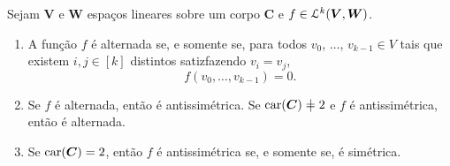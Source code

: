 \begin{proposition}
Sejam $\bm V$ e $\bm W$ espaços lineares sobre um corpo $\bm C$ e $f \in \mathcal{L}^k(\bm V,\bm W)$.
	\begin{enumerate}
	\item A função $f$ é alternada se, e somente se, para todos $v_0$, $\ldots$, $v_{k-1} \in V$ tais que existem $i,j \in [k]$ distintos satizfazendo $v_i = v_j$,
	\begin{equation*}
	f(v_0,\ldots,v_{k-1})=0.
	\end{equation*} 
	\item Se $f$ é alternada, então é antissimétrica. Se $\car(\bm C) \neq 2$ e $f$ é antissimétrica, então é alternada.
	\item Se $\operatorname{car}(\bm C) = 2$, então $f$ é antissimétrica se, e somente se, é simétrica.
	\end{enumerate}
\end{proposition}
